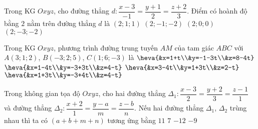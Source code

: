 \begin{ex}%
Trong KG $Oxyz$, cho đường thẳng $d\colon \dfrac{x-3}{-1}=\dfrac{y+1}{2}=\dfrac{z+2}{3}$. Điểm có hoành độ bằng $2$ nằm trên đường thẳng $d$ là
\choice
{\True $\left(2;1;1\right)$}
{$\left(2;-1;-2\right)$}
{$\left(2;0;0\right)$}
{$\left(2;-3;-2\right)$}

\end{ex}

\begin{ex}%
Trong KG $Oxyz$, phương trình đường trung tuyến $AM$ của tam giác $ABC$ với $A(3;1;2)$, $B(-3;2;5)$, $C(1;6;-3)$ là
\choice
{$\heva{&x=1+t\\&y=-1-3t\\&z=8-4t}$}
{$\heva{&x=1-4t\\&y=-3+3t\\&z=4-t}$}
{\True $\heva{&x=3-4t\\&y=1+3t\\&z=2-t}$}
{$\heva{&x=1+3t\\&y=-3+4t\\&z=4-t}$}
\end{ex}

\begin{ex}%
Trong không gian tọa độ $Oxyz$, cho hai đường thẳng $\Delta_1\colon \dfrac{x-3}{2}=\dfrac{y+2}{3}=\dfrac{z-1}{1}$ và đường thẳng $\Delta_2\colon \dfrac{x+2}{1}=\dfrac{y-a}{m}=\dfrac{z-b}{n}$. Nếu hai đường thẳng $\Delta_1$, $\Delta_2$ trùng nhau thì ta có $(a+b+m+n)$ tương ứng bằng
\choice
{$11$}
{$7$}
{$-12$}
{\True $-9$}
\end{ex}

